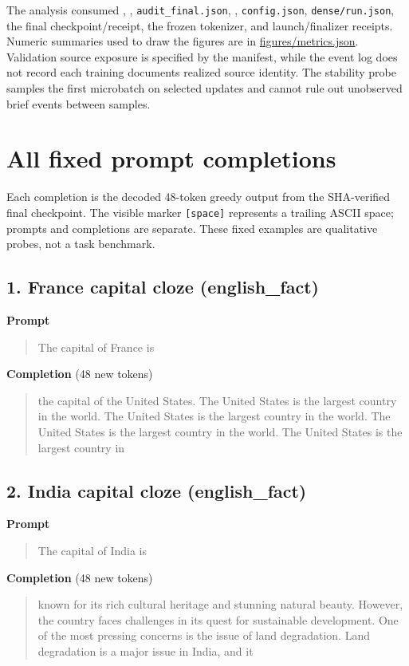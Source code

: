 \documentclass[10pt,a4paper]{article}
\begin{document}
The analysis consumed ,
, \texttt{audit\_final.json},
, \texttt{config.json},
\texttt{dense/run.json}, the final checkpoint/receipt, the frozen
tokenizer, and launch/finalizer receipts. Numeric summaries used to draw
the figures are in \url{figures/metrics.json}. Validation source
exposure is specified by the manifest, while the event log does not
record each training document\textquotesingle s realized source
identity. The stability probe samples the first microbatch on selected
updates and cannot rule out unobserved brief events between samples.

\clearpage
\appendix\section{All fixed prompt completions}
Each completion is the decoded 48-token greedy output from the SHA-verified final checkpoint. The visible marker \texttt{[space]} represents a trailing ASCII space; prompts and completions are separate. These fixed examples are qualitative probes, not a task benchmark.
\filbreak
\subsection*{1. France capital cloze (english\_fact)}
\textbf{Prompt}\par
\begin{quote}\small\raggedright  The capital of France is\par\end{quote}
\textbf{Completion} (48 new tokens)\par
\begin{quote}\small\raggedright  \hspace*{0.5em}the capital of the United States. The United States is the largest country in the world. The United States is the largest country in the world. The United States is the largest country in the world. The United States is the largest country in\par\end{quote}
\filbreak
\subsection*{2. India capital cloze (english\_fact)}
\textbf{Prompt}\par
\begin{quote}\small\raggedright  The capital of India is\par\end{quote}
\textbf{Completion} (48 new tokens)\par
\begin{quote}\small\raggedright  \hspace*{0.5em}known for its rich cultural heritage and stunning natural beauty. However, the country faces challenges in its quest for sustainable development. One of the most pressing concerns is the issue of land degradation. Land degradation is a major issue in India, and it\par\end{quote}
\filbreak
\end{document}
